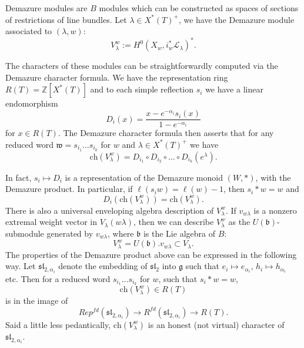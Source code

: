 \documentclass[12pt,reqno]{amsart}
\theoremstyle{definition}
\begin{document}
Demazure modules are $B$ modules which can be constructed as spaces of sections of restrictions of line bundles. Let $\lambda \in X^*(T)^+$, we have the Demazure module associated to $(\lambda, w)$: \[V_{\lambda}^w:=H^0(X_w, i_w^*\mathscr{L}_{\lambda})^*.\] 



The characters of these modules can be straightforwardly computed via the Demazure character formula. We have the representation ring $R(T)=\mathbb{Z}[X^*(T)]$ and to each simple reflection $s_i$ we have a linear endomorphism \[D_{i} (x) = \frac{x-e^{-\alpha_i} s_i(x)}{1-e^{-\alpha_i}}\] for $x \in R(T)$. The Demazure character formula then asserts that for any reduced word $\mathfrak{w}=s_{i_1} \dots s_{i_k}$ for $w$ and $\lambda \in X^*(T)^+$ we have \[\mathrm{ch}(V_{\lambda}^w) = D_{i_1} \circ D_{i_2} \circ \dots \circ D_{i_k} (e^{\lambda}).\]

In fact, $s_i \mapsto D_i$ is a representation of the Demazure monoid $(W, *)$, with the Demazure product. In particular, if $\ell(s_i w) =\ell(w)-1$, then $s_i *w=w$ and \[D_{i} \left(\mathrm{ch}(V_{\lambda}^w)\right) = \mathrm{ch}(V_{\lambda}^w).\]
There is also a universal enveloping algebra description of $V_{\lambda}^w$. If $v_{w \lambda}$ is a nonzero extremal weight vector in $V_{\lambda}(w \lambda)$, then we can describe $V_{\lambda}^w$ as the $U(\mathfrak{b})$-submodule generated by $v_{w \lambda}$, where $\mathfrak{b}$ is the Lie algebra of $B$:  \[V_{\lambda}^w = U(\mathfrak{b}) . v_{w \lambda} \subset V_{\lambda}.\]The properties of the Demazure product above can be expressed in the following way. Let $\mathfrak{sl}_{2, \alpha_i}$ denote the embedding of $\mathfrak{sl}_{2}$ into $\mathfrak{g}$ such that $e_i \mapsto e_{\alpha_i}$, $h_{i } \mapsto h_{\alpha_i}$ etc. Then for a reduced word $s_{i_1} \dots s_{i_k}$ for $w$, such that $s_i * w=w$, \[\mathrm{ch}(V_{\lambda}^w) \in R(T)\] is in the image of \[Rep^{fd}(\mathfrak{sl}_{2, \alpha_i}) \rightarrow R^{fd}(\mathfrak{sl}_{2, \alpha_i}) \rightarrow R(T).\] Said a little less pedantically, $\mathrm{ch}(V_{\lambda}^w)$ is an honest (not virtual) character of $\mathfrak{sl}_{2, \alpha_i}$.



\end{document}
